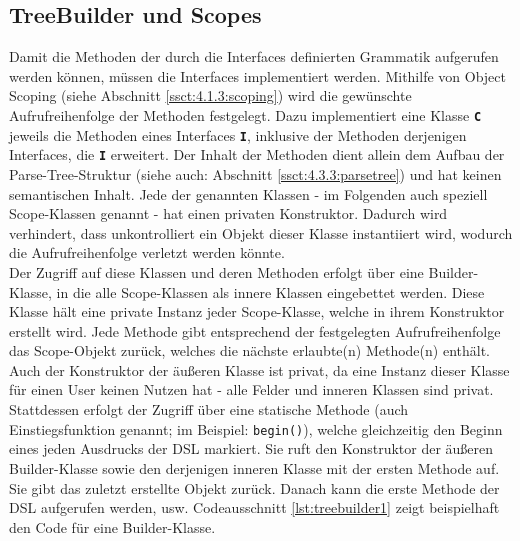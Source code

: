 \subsection{TreeBuilder und Scopes}\label{ssct:4.3.2:treebuilder}
Damit die Methoden der durch die Interfaces definierten Grammatik aufgerufen werden können, müssen die Interfaces implementiert werden. Mithilfe von Object Scoping (siehe Abschnitt \ref{ssct:4.1.3:scoping}) wird die gewünschte Aufrufreihenfolge der Methoden festgelegt. Dazu implementiert eine Klasse \textbf{\texttt{C}} jeweils die Methoden eines Interfaces \textbf{\texttt{I}}, inklusive der Methoden derjenigen Interfaces, die \textbf{\texttt{I}} erweitert. Der Inhalt der Methoden dient allein dem Aufbau der Parse-Tree-Struktur (siehe auch: Abschnitt \ref{ssct:4.3.3:parsetree}) und hat keinen semantischen Inhalt. Jede der genannten Klassen - im Folgenden auch speziell Scope-Klassen genannt - hat einen privaten Konstruktor. Dadurch wird verhindert, dass unkontrolliert ein Objekt dieser Klasse instantiiert wird, wodurch die Aufrufreihenfolge verletzt werden könnte.\\
Der Zugriff auf diese Klassen und deren Methoden erfolgt über eine Builder-Klasse, in die alle Scope-Klassen als innere Klassen eingebettet werden. Diese Klasse hält eine private Instanz jeder Scope-Klasse, welche in ihrem Konstruktor erstellt wird. Jede Methode gibt entsprechend der festgelegten Aufrufreihenfolge das Scope-Objekt zurück, welches die nächste erlaubte(n) Methode(n) enthält. Auch der Konstruktor der äußeren Klasse ist privat, da eine Instanz dieser Klasse für einen User keinen Nutzen hat - alle Felder und inneren Klassen sind privat. Stattdessen erfolgt der Zugriff über eine statische Methode (auch Einstiegsfunktion genannt; im Beispiel: \texttt{begin()}), welche gleichzeitig den Beginn eines jeden Ausdrucks der DSL markiert. Sie ruft den Konstruktor der äußeren Builder-Klasse sowie den derjenigen inneren Klasse mit der ersten Methode auf. Sie gibt das zuletzt erstellte Objekt zurück. Danach kann die erste Methode der DSL aufgerufen werden, usw. Codeausschnitt \ref{lst:treebuilder1} zeigt beispielhaft den Code für eine Builder-Klasse.

